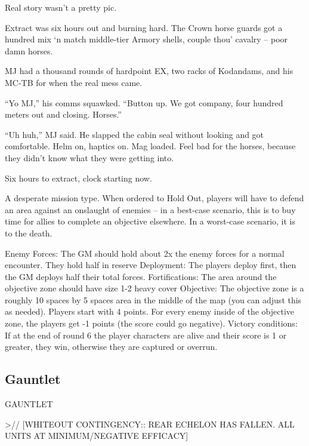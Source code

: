           Real story wasn’t a pretty pic.

          Extract was six hours out and burning hard. The Crown horse guards got a hundred mix ‘n match
          middle-tier Armory shells, couple thou’ cavalry -- poor damn horses.

          MJ had a thousand rounds of hardpoint EX, two racks of Kodandams, and his MC-TB for when the
          real mess came.

          “Yo MJ,” his comms squawked. “Button up. We got company, four hundred meters out and closing.
          Horses.”

          “Uh huh,” MJ said. He slapped the cabin seal without looking and got comfortable. Helm on, haptics
          on. Mag loaded. Feel bad for the horses, because they didn’t know what they were getting into.

          Six hours to extract, clock starting now.

A desperate mission type. When ordered to Hold Out, players will have to defend an area against
an onslaught of enemies -- in a best-case scenario, this is to buy time for allies to complete an
objective elsewhere. In a worst-case scenario, it is to the death.




Enemy Forces: The GM should hold about 2x the enemy forces for a normal encounter. They
hold half in reserve
Deployment: The players deploy first, then the GM deploys half their total forces.
Fortifications: The area around the objective zone should have size 1-2 heavy cover
Objective: The objective zone is a roughly 10 spaces by 5 spaces area in the middle of the map
(you can adjust this as needed). Players start with 4 points. For every enemy inside of the
objective zone, the players get -1 points (the score could go negative).
Victory conditions:  If at the end of round 6 the player characters are alive and their score is 1 or
greater, they win, otherwise they are captured or overrun.



\subsection{Gauntlet}


                                                             GAUNTLET

                                                             >// [WHITEOUT CONTINGENCY:: REAR
                                                             ECHELON HAS FALLEN. ALL UNITS AT
                                                             MINIMUM/NEGATIVE EFFICACY]

